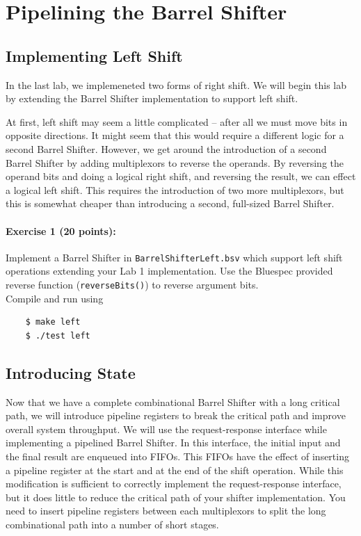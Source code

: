 \documentclass{article}
\begin{document}
\section{Pipelining the Barrel Shifter}

\subsection{Implementing Left Shift}
In the last lab, we implemeneted two forms of right shift. We will begin this lab by extending the
Barrel Shifter implementation to support left shift.

At first, left shift may seem a little complicated – after all we must move bits in opposite
directions. It might seem that this would require a different logic for a second Barrel Shifter. However, we get
around the introduction of a second Barrel Shifter by adding multiplexors to reverse the operands.
By reversing the operand bits and doing a logical right shift, and reversing the result, we can effect
a logical left shift. This requires the introduction of two more multiplexors, but this is somewhat
cheaper than introducing a second, full-sized Barrel Shifter.

\paragraph{\bf Exercise 1 (20 points):} Implement a Barrel Shifter in  \texttt{BarrelShifterLeft.bsv} 
which support left shift operations extending your Lab 1 implementation. 
Use the Bluespec provided reverse function (\texttt{reverseBits()}) to reverse argument bits.
\\\indent Compile and run using

\begin{Verbatim}
    $ make left
    $ ./test left
\end{Verbatim}

\subsection{Introducing State}
Now that we have a complete combinational Barrel Shifter with a long critical path, we will introduce
pipeline registers to break the critical path and improve overall system throughput. We will use
the request-response interface while implementing a pipelined Barrel Shifter. In this interface, 
the initial input and the final result are enqueued into FIFOs. This FIFOs have the effect of
inserting a pipeline register at the start and at the end of the shift operation.
While this modification is sufficient to correctly implement the request-response interface, 
but it does little to reduce the critical path of your shifter implementation.
You need to insert pipeline registers between each multiplexors to split the long combinational path into a number of short stages.
\end{document}
